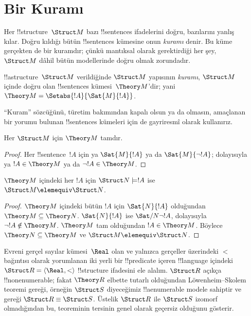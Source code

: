 


\section{Bir  Kuramı}

Her !!{structure}~$\Struct M$ bazı !!{sentence}s ifadelerini doğru,
bazılarını yanlış kılar. Doğru kıldığı bütün !!{sentence}s kümesine
onun \emph{kuramı} denir. Bu küme gerçekten de bir kuramdır; çünkü
mantıksal olarak gerektirdiği her şey, $\Struct M$ dâhil bütün
modellerinde doğru olmak zorundadır.

\begin{defn}
  !!a{structure}~$\Struct M$ verildiğinde $\Struct M$ yapısının
  \emph{kuramı}, $\Struct M$ içinde doğru olan !!{sentence}s
  kümesi~$\Theory M$'dir; yani
  $\Theory M=\Setabs{!A}{\Sat{M}{!A}}$.
\end{defn}

``Kuram'' sözcüğünü, türetim bakımından kapalı olsun ya da olmasın,
amaçlanan bir yorumu bulunan !!{sentence}s kümeleri için de gayriresmî
olarak kullanırız.

\begin{prop}
Her $\Struct M$ için $\Theory M$ tamdır.
\end{prop}

\begin{proof}
Her !!{sentence}~$!A$ için ya $\Sat{M}{!A}$ ya da
$\Sat{M}{\lnot !A}$; dolayısıyla ya $!A\in\Theory M$ ya da
$\lnot !A\in\Theory M$.
\end{proof}

\begin{prop}
  $\Theory M$ içindeki her $!A$ için $\Struct N\models !A$ ise
  $\Struct M\elemequiv\Struct N$.
\end{prop}

\begin{proof}
$\Theory M$ içindeki bütün $!A$ için $\Sat{N}{!A}$ olduğundan
$\Theory M\subseteq\Theory N$. $\Sat{N}{!A}$ ise
$\Sat/{N}{\lnot !A}$, dolayısıyla $\lnot !A\notin\Theory M$.
$\Theory M$ tam olduğundan $!A\in\Theory M$. Böylece
$\Theory N\subseteq\Theory M$ ve $\Struct M\elemequiv\Struct N$.
\end{proof}

\begin{rem}
  Evreni gerçel sayılar kümesi~$\Real$ olan ve yalnızca gerçeller
  üzerindeki $<$ bağıntısı olarak yorumlanan iki yerli bir
  !!{predicate} içeren !!{language} içindeki
  $\Struct R=\langle\Real,<\rangle$ !!{structure} ifadesini ele alalım.
  $\Struct R$ açıkça !!{nonenumerable}; fakat $\Theory R$ elbette
  tutarlı olduğundan Löwenheim--Skolem teoremi gereği, örneğin
  $\Struct S$ diyeceğimiz !!a{enumerable} modele sahiptir ve
   gereği $\Struct R\equiv\Struct S$. Üstelik
  $\Struct R$ ile $\Struct S$ izomorf olmadığından bu,
   teoreminin tersinin genel olarak geçersiz
  olduğunu gösterir.
\end{rem}

